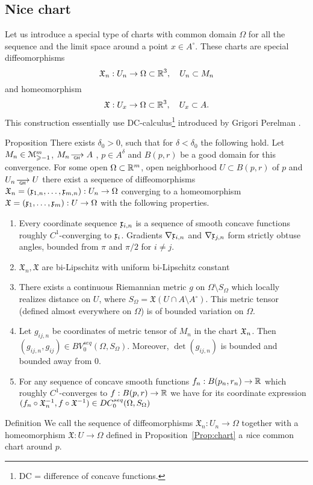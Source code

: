 
\subsection{Nice chart} 

Let us introduce a special type of charts with common domain $\Omega$ for all the sequence and the limit space around a  point $x\in A^\circ$.
These charts are special diffeomorphisms
\[\mathfrak X_n:U_n\to\Omega\subset\mathbb{R}^3,\quad U_n\subset M_n\]
and homeomorphism
\[\mathfrak X:U_x\to\Omega\subset\mathbb{R}^3,\quad U_x\subset A.\]
This construction essentially use DC-calculus\footnote{DC = difference of concave functions.}
introduced by Grigori Perelman \cite{PerDC}.

\begin{thm}{ Proposition}\label{Prop:chart}
	There exists $\delta_0>0$, such that for $\delta<\delta_0$
	the following hold.	
	Let   
	$M_n\in\mathcal M_{\geqslant -1}^m$,
	$M_n\GHto A$ , $ p\in A^\delta$
	and $B(p,r)$
	be a good domain for this convergence.
	For some open
	$\Omega\subset \mathbb{R}^m$, open 
	neighborhood $U\subset B(p,r)$ of $p$
	and $U_n\GHto U$ 
	there exist a
	sequence of
	diffeomorphisms $\mathfrak X_n=(\mathfrak x_{1,n},\dots,\mathfrak x_{m,n}):U_n\to\Omega$
	converging to a homeomorphism 	$\mathfrak X=(\mathfrak x_{1},\dots,\mathfrak x_{m}):U\to\Omega$ with 
	the following properties.
	
	\begin{enumerate}[label=\alph*. ]
	
	\item\label{obtuse}

 Every coordinate sequence $\mathfrak x_{i,n}$ is a sequence of smooth concave functions roughly $C^1$-converging to $\mathfrak x_i$. Gradients
	$\nabla\mathfrak x_{i,n}$ and $\nabla\mathfrak x_{j,n}$ form strictly obtuse angles,
	bounded from $\pi$ and $\pi/2$ for
	$i\neq j$. 
	\item $\mathfrak X_n, \mathfrak X$ are bi-Lipschitz 
	with uniform  bi-Lipschitz 
	constant
	
\item\label{metric} 
	There exists a continuous Riemannian metric
	$g$ on $\Omega\setminus S_\Omega$ which locally 
	realizes distance on $U$, where
	$S_\Omega=\mathfrak X(U\cap A\setminus A^\circ)$.
	This metric tensor 
	(defined almost everywhere on $\Omega$)
	is of bounded variation
	on $\Omega$. 
	
\item\label{metricseq}
	Let $g_{ij,n}$ be coordinates of metric tensor of $M_n$ 
	in the chart $\mathfrak X_n$. 
	Then
	$(g_{ij,n}, g_{ij})\in BV_0^{seq}(\Omega, S_\Omega)$.
	Moreover, $\det(g_{ij,n})$ is bounded and bounded away from 0.
	
	
	\item\label{funktioninchart}
	For any
	sequence
	of concave smooth functions
	$f_n:B(p_n,r_n)\to\mathbb{R}$ 
	which roughly $C^1$-converges to  $f:B(p,r)\to\mathbb{R}$ we have for its coordinate
	expression
	$(f_n\circ\mathfrak X_n^{-1}, f\circ\mathfrak X^{-1})\in DC_0^{seq}(\Omega, S_\Omega)$
	
	\end{enumerate}
\end{thm}

\begin{thm}{Definition}
	We call the sequence of
	diffeomorphisms $\mathfrak X_n:U_n\to\Omega$
	together with a homeomorphism 	$\mathfrak X:U\to\Omega$
	defined in
Proposition~\ref{Prop:chart}
a {\emph nice common chart} around $p$.

\end{thm}
